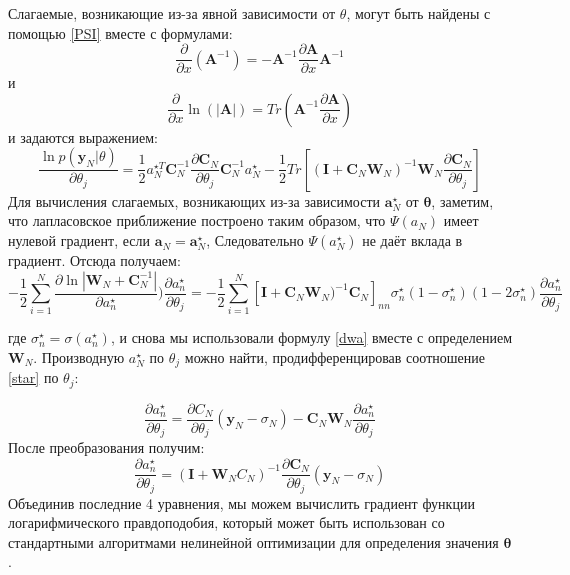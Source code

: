 {Слагаемые, возникающие из-за явной зависимости от $\theta$, могут быть найдены с помощью \ref{PSI} вместе с формулами: 
\begin{equation}
\label{odin}
    \frac{\partial}{\partial x}(\mathbf{A}^{-1})=-\mathbf{A}^{-1}\frac{\partial \mathbf{A}}{\partial x}\mathbf{A}^{-1}
\end{equation}
и 
\begin{equation}
\label{dwa}
    \frac{\partial}{\partial x}\ln(|\mathbf{A}|)=Tr(\mathbf{A}^{-1}\frac{\partial \mathbf{A}}{\partial x})
\end{equation} 
и задаются выражением:
\[
\label{urav1}
\frac{\ln p(\mathbf{y}_N|\theta)}{\partial \theta_j} = \frac{1}{2}a_N^{\star T}\mathbf{C}_N^{-1}\frac{\partial \mathbf{C}_N}{\partial \theta_j}\mathbf{C}_N^{-1}a_N^{\star} - \frac{1}{2}Tr[(\mathbf{I} + \mathbf{C}_N\mathbf{W}_N)^{-1}\mathbf{W}_N\frac{\partial \mathbf{C}_N}{\partial \theta_j}] 
\]
Для вычисления слагаемых, возникающих из-за зависимости $\mathbf{a}_N^{\star}$ от $\mathbf{\theta}$, заметим, что лапласовское приближение построено таким образом, что $\Psi(a_N)$ имеет нулевой градиент, если $\mathbf{a}_N=\mathbf{a}_N^{\star}$, Следовательно $\Psi(a_N^{\star})$ не даёт вклада в градиент. Отсюда получаем:
\[
\label{urav2}
-\frac{1}{2} \displaystyle \sum_{i=1}^{N} \frac{\partial \ln|\mathbf{W}_N + \mathbf{C}_N^{-1}|}{\partial a_n^{\star}})\frac{\partial a_n^{\star}}{\partial \theta_j} = -\frac{1}{2} \displaystyle \sum_{i=1}^N [\mathbf{I} + \mathbf{C}_N\mathbf{W}_N)^{-1}\mathbf{C}_N]_{nn} \sigma_{n}^{\star}(1-\sigma_{n}^{\star})(1-2\sigma_{n}^{\star})\frac{\partial a_n^{\star}}{\partial \theta_j} 
\]

где $\sigma_n^{\star}= \sigma(a_n^{\star})$, и снова мы использовали формулу \ref{dwa} вместе с определением $\mathbf{W}_N$. Производную $a_N^{\star}$ по $\theta_j$ можно найти, продифференцировав соотношение \ref{star} по $\theta_j$:

\[
\frac{\partial a_n^{\star}}{\partial \theta_j} = \frac{\partial C_N}{\partial \theta_j} (\mathbf{y}_N-\sigma_N)-\mathbf{C}_N \mathbf{W}_N \frac{\partial a_n^{\star}}{\partial \theta_j}  
\]
После преобразования получим:
\[
\label{urav3}
\frac{\partial a_n^{\star}}{\partial \theta_j} = (\mathbf{I} + \mathbf{W}_NC_N)^{-1} \frac{\partial \mathbf{C}_N}{\partial \theta_j} (\mathbf{y}_N-\sigma_N)  
\]
Объединив последние 4 уравнения, мы можем вычислить градиент функции логарифмического правдоподобия, который может быть использован со стандартными алгоритмами нелинейной оптимизации для определения значения $\mathbf{\theta}$.

}

